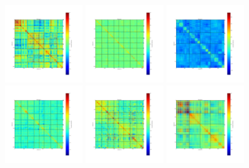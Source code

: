 \begin{figure}[ht]
\begin{center}
\includegraphics[width=0.3\textwidth]{Figures/DarkTests/corrmat_TOI_CM_array_3_20161213s72.pdf}
\includegraphics[width=0.3\textwidth]{Figures/DarkTests/corrmat_TOI_PCA_array_1_20161213s72.pdf}
\includegraphics[width=0.3\textwidth]{Figures/DarkTests/corrmat_TOI_PCA_array_2_20161213s72.pdf}
\includegraphics[width=0.3\textwidth]{Figures/DarkTests/corrmat_TOI_PCA_array_3_20161213s72.pdf}
\includegraphics[width=0.3\textwidth]{Figures/DarkTests/corrmat_TOI_BC_array_1_20161213s72.pdf}
\includegraphics[width=0.3\textwidth]{Figures/DarkTests/corrmat_TOI_BC_array_2_20161213s72.pdf}

\end{center}
\end{figure}
